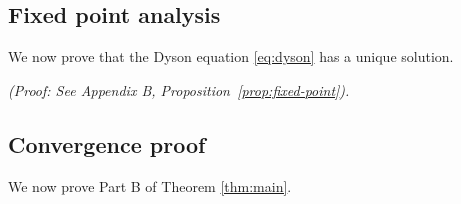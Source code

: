 \subsection{Fixed point analysis}

We now prove that the Dyson equation \eqref{eq:dyson} has a unique solution.


\emph{(Proof: See Appendix B, Proposition~\ref{prop:fixed-point}).}

\subsection{Convergence proof}

We now prove Part B of Theorem \ref{thm:main}.

